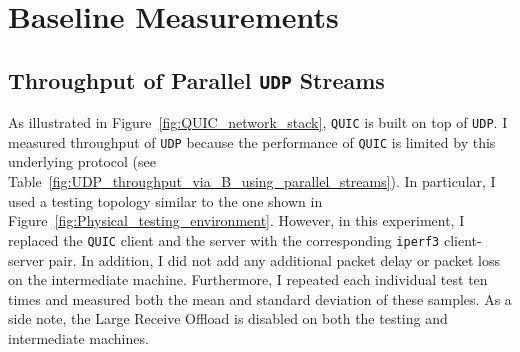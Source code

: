 \documentclass[12pt,a4paper]{report}
\begin{document}
\section{Baseline Measurements}


\subsection{Throughput of Parallel \texttt{UDP} Streams} \label{section_Throughput_of_Parallel_UDP_Streams}

As illustrated in Figure~\ref{fig:QUIC_network_stack}, \texttt{QUIC} is built on top of \texttt{UDP}.
I measured throughput of \texttt{UDP} because the performance of \texttt{QUIC} is limited by this underlying protocol (see Table~\ref{fig:UDP_throughput_via_B_using_parallel_streams}).
In particular, I used a testing topology similar to the one shown in  Figure~\ref{fig:Physical_testing_environment}.
However, in this experiment, I replaced the \texttt{QUIC} client and the server with the corresponding \texttt{iperf3} client-server pair.
In addition, I did not add any additional packet delay or packet loss on the intermediate machine.
Furthermore, I repeated each individual test ten times and measured both the mean and standard deviation of these samples.
As a side note, the Large Receive Offload is disabled on both the testing and intermediate machines.
\end{document}
